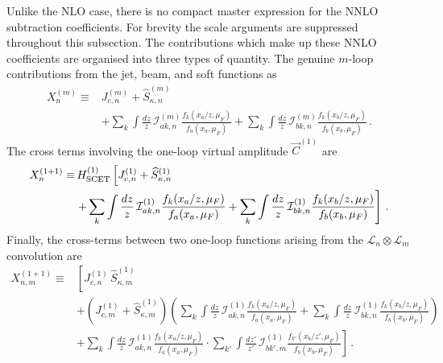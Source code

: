 Unlike the NLO case, there is no compact master expression for the
NNLO subtraction coefficients. For brevity the scale arguments are suppressed throughout this subsection. The contributions which make up these NNLO coefficients are organised into three types of quantity. The genuine $m$-loop contributions from the jet, beam, and soft functions as
\begin{equation}
\begin{aligned}
\label{eq:Xn-def}
    X_n^{(m)} \equiv &J_{c,n}^{(m)} + \widehat{S}_{\kappa,n}^{(m)} \\
&   + \sum_k\int\frac{dz}{z}\,\mathcal{I}_{ak,n}^{(m)}\frac{f_k(x_a/z,\mu_F)}{f_a(x_a,\mu_F)}
    + \sum_k\int\frac{dz}{z}\,\mathcal{I}_{bk,n}^{(m)}\frac{f_k(x_b/z,\mu_F)}{f_b(x_b,\mu_F)}\,.
    \end{aligned}
\end{equation}
The cross terms involving the one-loop
virtual amplitude $\vec{C}^{(1)}$ are
\begin{equation}
\label{eq:Xn11-def}
\begin{aligned}
    X_n^{(1+1)} \equiv& \,H^{(1)}_{\rm SCET}
    \left[J_{c,n}^{(1)} + \widehat{S}_{\kappa,n}^{(1)} \right.\\
  &\left.  + \sum_k\int\frac{dz}{z}\,\mathcal{I}_{ak,n}^{(1)}\frac{f_k(x_a/z,\mu_F)}{f_a(x_a,\mu_F)}
    + \sum_k\int\frac{dz}{z}\,\mathcal{I}_{bk,n}^{(1)}\frac{f_k(x_b/z,\mu_F)}{f_b(x_b,\mu_F)}\right]\,.
    \end{aligned}
\end{equation}
Finally, the cross-terms between two one-loop functions arising from the
$\mathcal{L}_n\otimes\mathcal{L}_m$ convolution are
\begin{equation}
\label{eq:Xnm11-def}
\begin{aligned}
    X_{n,m}^{(1+1)} \equiv{}&
    \left[J_{c,n}^{(1)}\,\widehat{S}_{\kappa,m}^{(1)}\right.\\
    &+\!\left(J_{c,m}^{(1)}+\widehat{S}_{\kappa,m}^{(1)}\right)\!
    \left(\sum_k\int\frac{dz}{z}\,\mathcal{I}_{ak,n}^{(1)}
    \frac{f_k(x_a/z,\mu_F)}{f_a(x_a,\mu_F)}
    +\sum_k\int\frac{dz}{z}\,\mathcal{I}_{bk,n}^{(1)}
    \frac{f_k(x_b/z,\mu_F)}{f_b(x_b,\mu_F)}\right)\\
    &\left.+\sum_k\int\frac{dz}{z}\,\mathcal{I}_{ak,n}^{(1)}
    \frac{f_k(x_a/z,\mu_F)}{f_a(x_a,\mu_F)}
    \cdot\sum_{k'}\int\frac{dz'}{z'}\,\mathcal{I}_{bk',m}^{(1)}
    \frac{f_{k'}(x_b/z',\mu_F)}{f_b(x_b,\mu_F)}\right]\,.
\end{aligned}
\end{equation}
